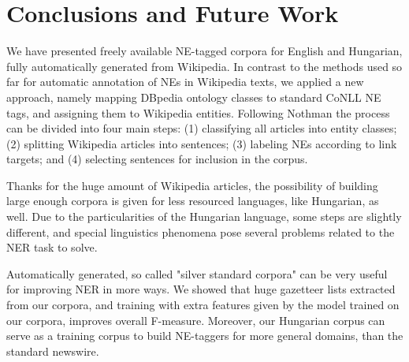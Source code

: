 \documentclass[11pt]{article}
\begin{document}
\section{Conclusions and Future Work}
\label{sec:conclusion}

We have presented freely available NE-tagged corpora for English and Hungarian, fully automatically generated from Wikipedia. In contrast to the methods used so far for automatic annotation of NEs in Wikipedia texts, we applied a new approach, namely mapping DBpedia ontology classes to standard CoNLL NE tags, and assigning them to Wikipedia entities. Following Nothman  the process can be divided into four main steps: (1) classifying all articles into entity classes; (2) splitting Wikipedia articles into sentences; (3) labeling NEs according to link targets; and (4) selecting sentences for inclusion in the corpus. 

Thanks for the huge amount of Wikipedia articles, the possibility of building large enough corpora is given for less resourced languages, like Hungarian, as well. Due to the particularities of the Hungarian language, some steps are slightly different, and special linguistics phenomena pose several problems related to the NER task to solve. 

Automatically generated, so called "silver standard corpora" can be very useful for improving NER in more ways. We showed that huge gazetteer lists extracted from our corpora, and training with extra features given by the model trained on our corpora, improves overall F-measure. Moreover, our Hungarian corpus can serve as a training corpus to build NE-taggers for more general domains, than the standard newswire.  




\end{document}

